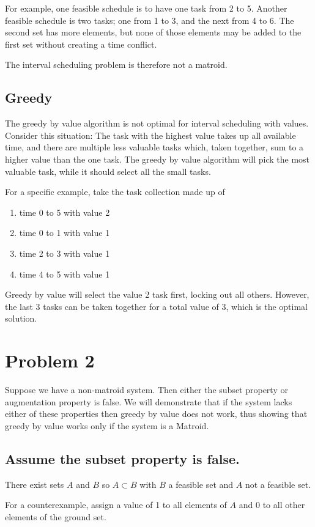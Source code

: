 \documentclass{article}
\begin{document}
For example, one feasible schedule is to have one task from 2 to 5. Another feasible schedule is two tasks; one from 1 to 3, and the next from 4 to 6. The second set has more elements, but none of those elements may be added to the first set without creating a time conflict.

The interval scheduling problem is therefore not a matroid.
\subsection{Greedy}
The greedy by value algorithm is not optimal for interval scheduling with values. Consider this situation: The task with the highest value takes up all available time, and there are multiple less valuable tasks which, taken together, sum to a higher value than the one task. The greedy by value algorithm will pick the most valuable task, while it should select all the small tasks.

For a specific example, take the task collection made up of
\begin{enumerate}
\item time 0 to 5 with value 2
\item time 0 to 1 with value 1
\item time 2 to 3 with value 1
\item time 4 to 5 with value 1
\end{enumerate}
Greedy by value will select the value 2 task first, locking out all others. However, the last 3 tasks can be taken together for a total value of 3, which is the optimal solution.

\section{Problem 2}

Suppose we have a non-matroid system. Then either the subset property or augmentation property is false. We will demonstrate that if the system lacks either of these properties then greedy by value does not work, thus showing that greedy by value works only if the system is a Matroid.


\subsection{Assume the subset property is false.}
There exist sets $A$ and $B$ so $A \subset B$ with $B$ a feasible set and $A$ not a feasible set.

For a counterexample, assign a value of 1 to all elements of $A$ and 0 to all other elements of the ground set.
\end{document}
